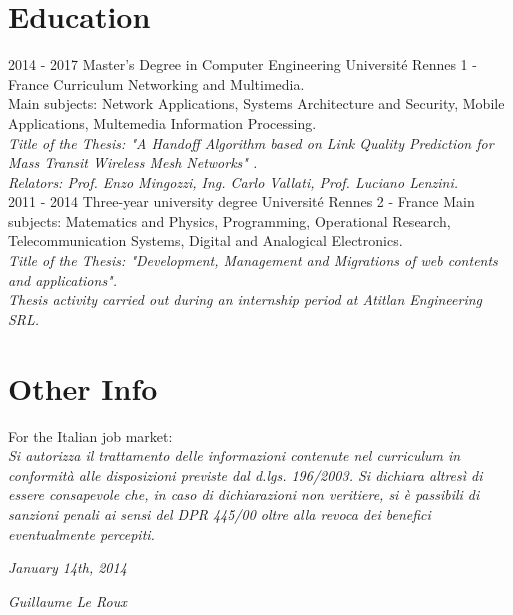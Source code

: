 \documentclass[]{friggeri-cv}
\begin{document}
\section{Education}
\begin{entrylist}
	\entry
	{2014 - 2017}
	{Master's Degree in Computer Engineering}
	{Université Rennes 1 - France}
	{Curriculum Networking and Multimedia.\\
	Main subjects: Network Applications, Systems Architecture and Security, Mobile Applications, Multemedia Information            Processing.\\
	\emph{Title of the Thesis: "A Handoff Algorithm based on Link Quality Prediction for Mass Transit Wireless Mesh Networks"      .}\\
	\emph{Relators: Prof. Enzo Mingozzi, Ing. Carlo Vallati, Prof. Luciano Lenzini.}\\}
	\entry
	{2011 - 2014}
	{ Three-year university degree }
	{Université Rennes 2 - France}
	{Main subjects: Matematics and Physics, Programming, Operational Research, Telecommunication Systems, Digital and Analogical Electronics.\\
	\emph{Title of the Thesis: "Development, Management and Migrations of web contents and applications".}\\
	\emph{Thesis activity carried out during an internship period at Atitlan Engineering SRL.}\\}
\end{entrylist}


\section{Other Info}
For the Italian job market:\\
\emph{Si autorizza il trattamento delle informazioni contenute nel curriculum in conformità alle disposizioni previste dal d.lgs. 196/2003. Si dichiara altresì di essere consapevole che, in caso di dichiarazioni non veritiere, si è passibili di sanzioni penali ai sensi del DPR 445/00 oltre alla revoca dei benefici eventualmente percepiti.}
\\
\begin{flushleft}
	\emph{January 14th, 2014}
\end{flushleft}
\begin{flushright}
	\emph{Guillaume Le Roux}
\end{flushright}

% 
\end{document}

